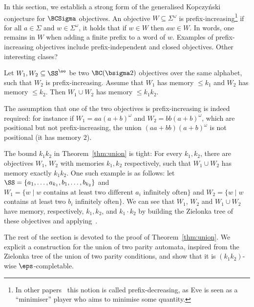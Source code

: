 
In this section, we establish a strong form of the generalised Kopczyński conjecture for $\BCSigma$ objectives.
An objective $W \subseteq \Sigma^\omega$ is prefix-increasing\footnote{In other papers~\cite{Ohlmann21PhD,Ohlmann23,CO25LMCS} this notion is called prefix-decreasing, as Eve is seen as a ``minimiser'' player who aims to minimise some quantity.}
 if for all $a \in \Sigma$ and $w \in \Sigma^\omega$, it holds that if $w \in W$ then $aw \in W$.
In words, one remains in $W$ when adding a finite prefix to a word of $w$.
Examples of prefix-increasing objectives include prefix-independent and closed objectives.
\ac{Other interesting clases? }


\begin{theorem}\label{thm:union}
    Let $W_1, W_2 \subseteq \SS^\oo$ be two $\BC(\bsigma 2)$ objectives over the same alphabet, such that $W_{2}$ is prefix-increasing.
    Assume that $W_{1}$ has memory $\leq k_1$ and $W_{2}$ has memory $\leq k_2$.
    Then $W_1 \cup W_2$ has memory $\leq k_1 k_2$.
\end{theorem}

\begin{remark}
The assumption that one of the two objectives is prefix-increasing is indeed required: for instance if $W_1=aa(a+b)^\omega$ and $W_{2}=bb(a+b)^\omega$, which are positional but not prefix-increasing, the union $(aa+bb)(a+b)^\omega$ is not positional (it has memory $2$).

\end{remark}
\begin{remark}
    The bound $k_1k_2$ in Theorem~\ref{thm:union} is tight: For every $k_1, k_2$, there are objectives $W_1$, $W_2$ with memories $k_1, k_2$ respectively, such that $W_1 \cup W_2$ has memory exactly $k_1k_2$. 
    One such example is as follows: let $\SS = \{a_1,\dots, a_{k_1}, b_1,\dots, b_{k_2}\}$ and 
    $W_1 = \{ w \mid w \text{ contains at } \text{least } \text{two } \text{different } a_i \text{ infinitely often} \}$ and $W_2 = \{ w \mid w$ contains at least two  $b_i$ infinitely often$\}$. 
    We can see that $W_1$, $W_2$ and $W_1\cup W_2$ have memory, respectively, $k_1, k_2$, and  $k_1\cdot k_2$ by building the Zielonka tree of these objectives and applying~\cite[Thms.~6,~14]{DJW1997memory}.
\end{remark}

The rest of the section is devoted to the proof of Theorem~\ref{thm:union}.
We explicit a construction for the union of two parity automata, inspired from the Zielonka tree of the union of two parity conditions, and show that it is $(k_1 k_2)$-wise $\eps$-completable.



